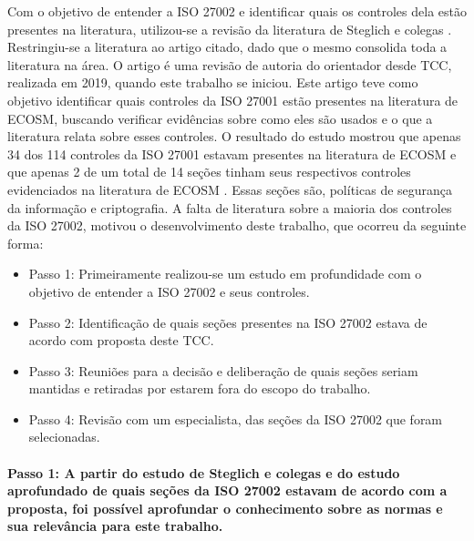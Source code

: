  Com o objetivo de entender a  ISO 27002 e identificar quais os controles dela estão presentes na literatura,
 utilizou-se a revisão da literatura de Steglich e colegas \cite{caio2019}. Restringiu-se a literatura ao artigo citado, dado que o mesmo consolida toda  a literatura na área. O artigo é uma revisão de autoria do orientador desde TCC, realizada em 2019, quando este trabalho se iniciou. Este artigo teve como objetivo identificar quais controles da ISO 27001 estão presentes na literatura de ECOSM, buscando verificar evidências sobre como eles são usados e o que a literatura relata sobre esses controles. O resultado do estudo mostrou que apenas 34 dos 114 controles da ISO 27001 estavam presentes na literatura de ECOSM e que apenas 2 de um total de 14 seções tinham seus respectivos controles evidenciados na literatura de ECOSM . Essas seções são, políticas de segurança da informação e criptografia. A falta de literatura sobre a maioria dos controles da ISO 27002, motivou o desenvolvimento deste trabalho, que ocorreu da seguinte forma:
 
 \begin{itemize}
    \item Passo 1: Primeiramente realizou-se um estudo em profundidade com o objetivo de entender a ISO 27002 e seus controles.
   
    \item Passo 2: Identificação de quais seções presentes na ISO 27002 estava de acordo com proposta deste TCC.
    
     \item Passo 3: Reuniões para a decisão e deliberação de quais seções seriam mantidas e retiradas por estarem fora do escopo do trabalho.
      
    \item Passo 4: Revisão com um especialista, das seções da ISO 27002 que foram selecionadas.
  \end{itemize}

 
 \noindent \paragraph{\textbf{Passo 1:} A partir do estudo de Steglich e colegas \cite{caio2019} e do estudo aprofundado de quais seções da ISO 27002 estavam de acordo com a proposta, foi possível aprofundar o conhecimento sobre as normas e sua relevância para este trabalho.}
 

